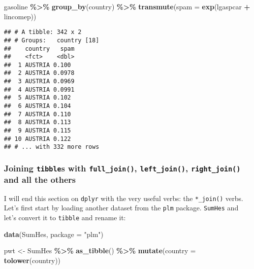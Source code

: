 \documentclass[
]{article}
\newenvironment{Shaded}{\begin{snugshade}}{\end{snugshade}}
\newcommand{\DataTypeTok}[1]{\textcolor[rgb]{0.13,0.29,0.53}{#1}}
\newcommand{\KeywordTok}[1]{\textcolor[rgb]{0.13,0.29,0.53}{\textbf{#1}}}
\newcommand{\NormalTok}[1]{#1}
\newcommand{\OperatorTok}[1]{\textcolor[rgb]{0.81,0.36,0.00}{\textbf{#1}}}
\newcommand{\StringTok}[1]{\textcolor[rgb]{0.31,0.60,0.02}{#1}}
\begin{document}
\begin{Shaded}
\begin{Highlighting}[]
\NormalTok{gasoline }\OperatorTok{\%\textgreater{}\%}
\StringTok{  }\KeywordTok{group\_by}\NormalTok{(country) }\OperatorTok{\%\textgreater{}\%}
\StringTok{  }\KeywordTok{transmute}\NormalTok{(}\DataTypeTok{spam =} \KeywordTok{exp}\NormalTok{(lgaspcar }\OperatorTok{+}\StringTok{ }\NormalTok{lincomep))}
\end{Highlighting}
\end{Shaded}

\begin{verbatim}
## # A tibble: 342 x 2
## # Groups:   country [18]
##    country   spam
##    <fct>    <dbl>
##  1 AUSTRIA 0.100 
##  2 AUSTRIA 0.0978
##  3 AUSTRIA 0.0969
##  4 AUSTRIA 0.0991
##  5 AUSTRIA 0.102 
##  6 AUSTRIA 0.104 
##  7 AUSTRIA 0.110 
##  8 AUSTRIA 0.113 
##  9 AUSTRIA 0.115 
## 10 AUSTRIA 0.122 
## # ... with 332 more rows
\end{verbatim}

\hypertarget{joining-tibbles-with-full_join-left_join-right_join-and-all-the-others}{%
\subsubsection{\texorpdfstring{Joining \texttt{tibble}s with \texttt{full\_join()}, \texttt{left\_join()}, \texttt{right\_join()} and all the others}{Joining tibbles with full\_join(), left\_join(), right\_join() and all the others}}\label{joining-tibbles-with-full_join-left_join-right_join-and-all-the-others}}

I will end this section on \texttt{dplyr} with the very useful verbs: the \texttt{*\_join()} verbs. Let's first
start by loading another dataset from the \texttt{plm} package. \texttt{SumHes} and let's convert it to \texttt{tibble}
and rename it:

\begin{Shaded}
\begin{Highlighting}[]
\KeywordTok{data}\NormalTok{(SumHes, }\DataTypeTok{package =} \StringTok{"plm"}\NormalTok{)}

\NormalTok{pwt \textless{}{-}}\StringTok{ }\NormalTok{SumHes }\OperatorTok{\%\textgreater{}\%}
\StringTok{  }\KeywordTok{as\_tibble}\NormalTok{() }\OperatorTok{\%\textgreater{}\%}
\StringTok{  }\KeywordTok{mutate}\NormalTok{(}\DataTypeTok{country =} \KeywordTok{tolower}\NormalTok{(country))}
\end{Highlighting}
\end{Shaded}
\end{document}
